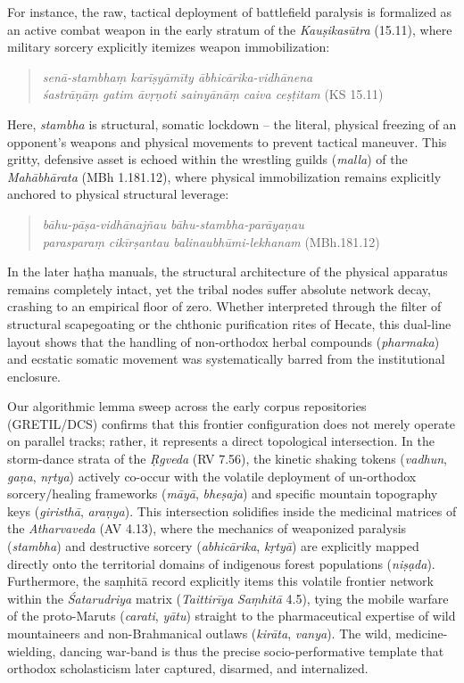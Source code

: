 \documentclass[11pt,twoside,letterpaper]{article}
\begin{document}
For instance, the raw, tactical deployment of battlefield paralysis is formalized as an active combat weapon in the early stratum of the \textit{Kauṣikasūtra} (15.11), where military sorcery explicitly itemizes weapon immobilization:
\begin{quote}
\small
\noindent\textit{senā-stambhaṃ karīṣyāmīty ābhicārika-vidhānena} \\
\noindent\textit{śastrāṇāṃ gatim āvṛṇoti sainyānāṃ caiva ceṣṭitam} (KS 15.11)
\end{quote}
Here, \textit{stambha} is structural, somatic lockdown -- the literal, physical freezing of an opponent's weapons and physical movements to prevent tactical maneuver. This gritty, defensive asset is echoed within the wrestling guilds (\textit{malla}) of the \textit{Mahābhārata} (MBh 1.181.12), where physical immobilization remains explicitly anchored to physical structural leverage:
\begin{quote}
\small
\noindent\textit{bāhu-pāṣa-vidhānajñau bāhu-stambha-parāyaṇau } \\
\noindent\textit{parasparaṃ cikīrṣantau balinaubhūmi-lekhanam} (MBh.181.12)
\end{quote}

In the later haṭha manuals, the structural architecture of the physical apparatus remains completely intact, yet the tribal nodes suffer absolute network decay, crashing to an empirical floor of zero. Whether interpreted through the filter of structural scapegoating \citep{Strelan2003} or the chthonic purification rites of Hecate, this dual-line layout shows that the handling of non-orthodox herbal compounds (\textit{pharmaka}) and ecstatic somatic movement was systematically barred from the institutional enclosure. 

Our algorithmic lemma sweep across the early corpus repositories (GRETIL/DCS) confirms that this frontier configuration does not merely operate on parallel tracks; rather, it represents a direct topological intersection. In the storm-dance strata of the \textit{Ṛgveda} (RV 7.56), the kinetic shaking tokens (\textit{vadhun}, \textit{gaṇa}, \textit{nṛtya}) actively co-occur with the volatile deployment of un-orthodox sorcery/healing frameworks (\textit{māyā}, \textit{bheṣaja}) and specific mountain topography keys (\textit{giristhā}, \textit{araṇya}). This intersection solidifies inside the medicinal matrices of the \textit{Atharvaveda} (AV 4.13), where the mechanics of weaponized paralysis (\textit{stambha}) and destructive sorcery (\textit{abhicārika}, \textit{kṛtyā}) are explicitly mapped directly onto the territorial domains of indigenous forest populations (\textit{niṣạda}). Furthermore, the saṃhitā record explicitly items this volatile frontier network within the \textit{Śatarudriya} matrix (\textit{Taittirīya Saṃhitā} 4.5), tying the mobile warfare of the proto-Maruts (\textit{carati}, \textit{yātu}) straight to the pharmaceutical expertise of wild mountaineers and non-Brahmanical outlaws (\textit{kirāta}, \textit{vanya}). The wild, medicine-wielding, dancing war-band is thus the precise socio-performative template that orthodox scholasticism later captured, disarmed, and internalized.
\end{document}
